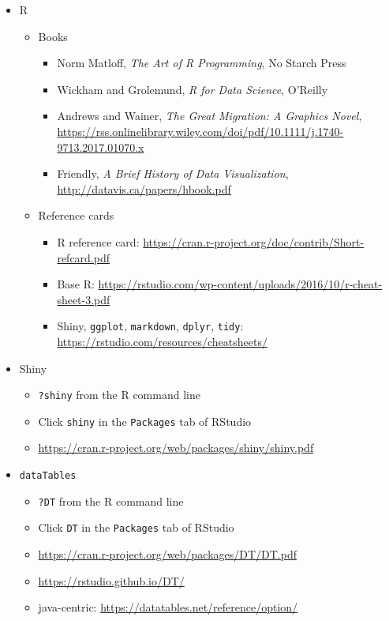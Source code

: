 \documentclass[10pt, letterpaper]{article}
\begin{document}
\begin{spacing}{1.0}
\begin{itemize}
  \item R
    \begin{itemize}   
      \item Books
        \begin{itemize}
          \item Norm Matloff, \textit{The Art of R Programming}, No Starch Press
          \item Wickham and Grolemund, \textit{R for Data Science}, O'Reilly
          \item Andrews and Wainer, \textit{The Great Migration:  A Graphics Novel}, \url{https://rss.onlinelibrary.wiley.com/doi/pdf/10.1111/j.1740-9713.2017.01070.x}
          \item Friendly, \textit{A Brief History of Data Visualization}, \url{http://datavis.ca/papers/hbook.pdf}
        \end{itemize}
      \item Reference cards
        \begin{itemize}
          \item R reference card:  \url{https://cran.r-project.org/doc/contrib/Short-refcard.pdf}
          \item Base R:  \url{https://rstudio.com/wp-content/uploads/2016/10/r-cheat-sheet-3.pdf}
          \item Shiny, \texttt{ggplot}, \texttt{markdown}, \texttt{dplyr}, \texttt{tidy}: \url{https://rstudio.com/resources/cheatsheets/}
        \end{itemize}
    \end{itemize}

  \item Shiny
    \begin{itemize}
        \item \texttt{?shiny} from the R command line
        \item Click \texttt{shiny} in the \texttt{Packages} tab of RStudio
        \item \url{https://cran.r-project.org/web/packages/shiny/shiny.pdf}
    \end{itemize}

  \item \texttt{dataTables}
    \begin{itemize}
        \item \texttt{?DT} from the R command line
        \item Click \texttt{DT} in the \texttt{Packages} tab of RStudio
        \item \url{https://cran.r-project.org/web/packages/DT/DT.pdf}
        \item \url{https://rstudio.github.io/DT/}
        \item java-centric:  \url{https://datatables.net/reference/option/}
    \end{itemize}


\end{itemize}
\end{spacing}
\end{document}
